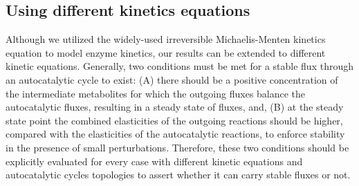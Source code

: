 \documentclass[a4page,notitlepage]{article}
\begin{document}
    \subsection{Using different kinetics equations}
    Although we utilized the widely-used irreversible Michaelis-Menten kinetics equation to model enzyme kinetics, our results can be extended to different kinetic equations.
    Generally, two conditions must be met for a stable flux through an autocatalytic cycle to exist: (A) there should be a positive concentration of the intermediate metabolites for which the outgoing fluxes balance the autocatalytic fluxes, resulting in a steady state of fluxes, and, (B) at the steady state point the combined elasticities of the outgoing reactions should be higher, compared with the elasticities of the autocatalytic reactions, to enforce stability in the presence of small perturbations.
    Therefore, these two conditions should be explicitly evaluated for every case with different kinetic equations and autocatalytic cycles topologies to assert whether it can carry stable fluxes or not.
\end{document}
